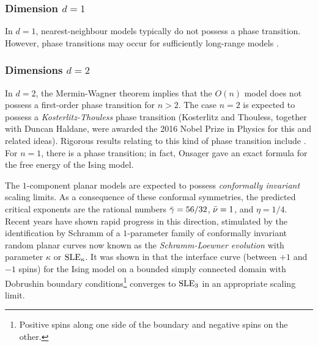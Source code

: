 \subsubsection{Dimension $d = 1$}

In $d = 1$, nearest-neighbour models typically do not possess a phase transition.
However, phase transitions may occur for sufficiently long-range models \cite{Dyso69}.

\subsubsection{Dimensions $d = 2$}

In $d = 2$, the Mermin-Wagner theorem \cite{MW66} implies that the $O(n)$ model does
not possess a first-order phase transition for $n > 2$. The case $n = 2$ is expected
to possess a \emph{Kosterlitz-Thouless} phase transition \cite{KT73}
(Kosterlitz and Thouless, together with Duncan Haldane, were awarded
the 2016 Nobel Prize in Physics for this and related ideas). Rigorous results relating
to this kind of phase transition include \cite{FS81,Falc12,Falc13}.
For $n = 1$, there is a phase transition; in fact, Onsager \cite{Onsager44} gave an
exact formula for the free energy of the Ising model.

The $1$-component planar models are expected to possess \emph{conformally invariant}
scaling limits. As a consequence of these conformal symmetries,
the predicted critical exponents are the rational numbers $\bar\gamma = 56/32$, $\bar\nu = 1$,
and $\eta = 1/4$. Recent years have shown rapid progress in this direction, stimulated
by the identification by Schramm \cite{Schramm00} of a $1$-parameter family of
conformally invariant random planar curves now known as the \emph{Schramm-Loewner
evolution} with parameter $\kappa$ or ${\rm SLE}_\kappa$. It was shown in \cite{CDHKS14}
that the interface curve (between $+ 1$ and $-1$ spins) for the Ising model on a
bounded simply connected domain with Dobrushin boundary
conditions\footnote{Positive spins along one side of the
boundary and negative spins on the other.} converges to ${\rm SLE}_3$ in
an appropriate scaling limit.

